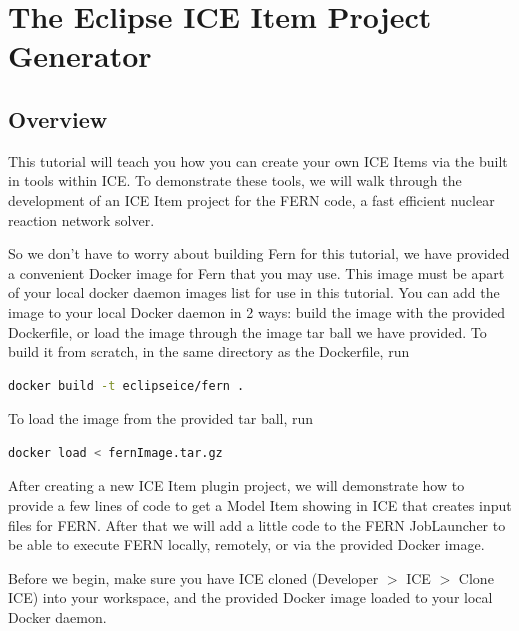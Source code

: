 \section*{The Eclipse ICE Item Project Generator}

\subsection*{Overview} 

This tutorial will teach you how you
can create your own ICE Items via the built in tools within ICE.  To demonstrate
these tools, we will walk through the development of an ICE Item project for the
FERN code, a fast efficient nuclear reaction network solver. 

So we don't have to worry about building Fern for this tutorial, we have
provided a convenient Docker image for Fern that you may use.  
This image must be apart of your local docker daemon images list for use in this
tutorial. You can add the image to your local Docker daemon in 2 ways: build the
image with the provided Dockerfile, or load the image through the image tar ball we have provided. To
build it from scratch, in the same directory as the Dockerfile, run 
\begin{lstlisting}[language=bash,caption={bash version}]
docker build -t eclipseice/fern .
\end{lstlisting}
To load the image from the provided tar ball, run 
\begin{lstlisting}[language=bash,caption={bash version}]
docker load < fernImage.tar.gz
\end{lstlisting}

After creating a new ICE Item plugin project, we will demonstrate how to
provide a few lines of code to get a Model Item showing in ICE that creates
input files for FERN. After that we will add a little code to the FERN
JobLauncher to be able to execute FERN locally, remotely, or via the
provided Docker image. 

Before we begin, make sure you have ICE cloned (Developer $>$ ICE $>$ Clone ICE)
into your workspace, and the provided Docker image loaded to your local Docker daemon. 

